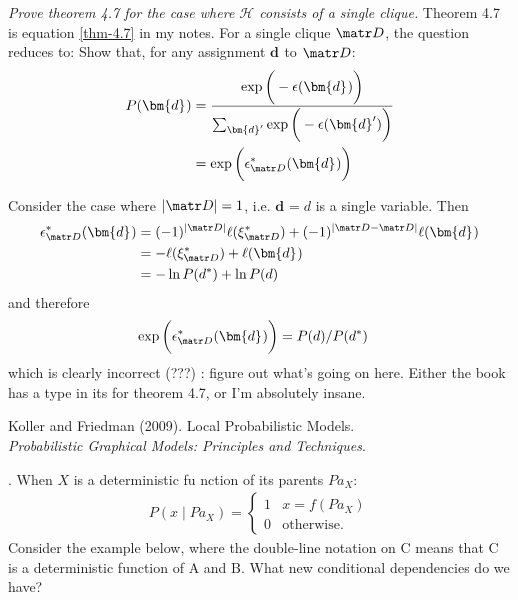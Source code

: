 \documentclass[11pt]{article}
\renewcommand\vec[2][]{\bm{#2}_{#1}}
\newcommand\p{\Needspace{10\baselineskip} \noindent}
\begin{document}
\begin{example}[Exercise 4.4]
\textit{Prove theorem 4.7 for the case where $\mathcal H$ consists of a single clique.} Theorem 4.7 is equation \ref{thm-4.7} in my notes. For a single clique $\matr D$, the question reduces to: Show that, for any assignment $\vec d$ to $\matr D$:
\begin{align}
	P(\vec d)
	&=  \frac{\exp\bigg( -\epsilon(\vec d)   \bigg)   }{   \sum_{\vec{d}'} \exp\bigg( -\epsilon(\vec{d}')   \bigg)   }    \\
	&= \exp\bigg( \epsilon^*_{\matr D} ( \vec d )  \bigg)
\end{align}

Consider the case where $|\matr D|= 1$, i.e. $\vec d = d$ is a single variable. Then
\begin{align}
	\epsilon^*_{\matr D}(\vec d) 
	&= (-1)^{|\matr D|} \ell(\xi^*_{\matr D}) + (-1)^{|\matr D - \matr D|}\ell(\vec d) \\
	&= -\ell(\xi^*_{\matr D}) + \ell(\vec d) \\
	&= -\ln P(d^*) + \ln P(d)
\end{align}
and therefore
\begin{align}
	 \exp\bigg( \epsilon^*_{\matr D} ( \vec d )  \bigg)
	 &= P(d) / P(d^*)
\end{align}
which is clearly incorrect (???) : figure out what's going on here. Either the book has a type in its for theorem 4.7, or I'm absolutely insane. 
\end{example}




\vspace{-1.7em}
{\scriptsize Koller and Friedman (2009). Local Probabilistic Models.\\ \textit{Probabilistic Graphical Models: Principles and Techniques}.\\ }

\p {}. When $X$ is a deterministic fu nction of its parents $Pa_X$:
\begin{align}
	P(x \mid Pa_X) = \begin{cases}
		1 & x = f(Pa_X) \\
		0 & \text{otherwise.}
	\end{cases}
\end{align}
Consider the example below, where the double-line notation on C means that C is a deterministic function of A and B. What new conditional dependencies do we have?
\end{document}
